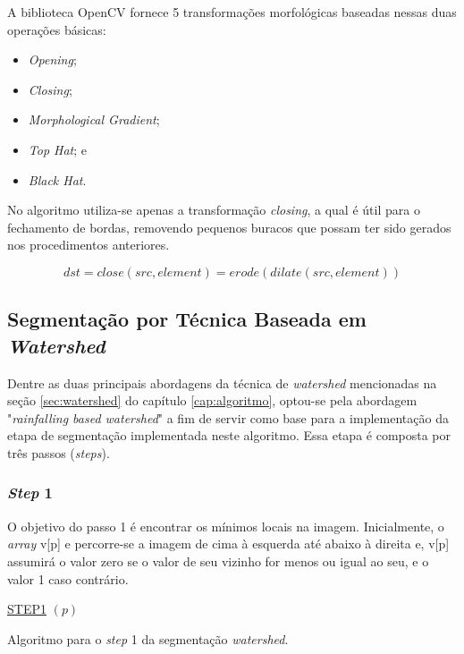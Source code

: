A biblioteca OpenCV fornece 5 transformações morfológicas baseadas nessas duas operações básicas:
\begin{itemize}
    \item \textit{Opening};
    \item \textit{Closing};
    \item \textit{Morphological Gradient};
    \item \textit{Top Hat}; e 
    \item \textit{Black Hat}.
\end{itemize} 

No algoritmo utiliza-se apenas a transformação \textit{closing}, a qual é útil para o fechamento de bordas, removendo pequenos buracos que possam ter sido gerados nos procedimentos anteriores. \citep{morphology_transformations}

\[dst = close(src, element) = erode(dilate(src, element))\]


\subsection{Segmentação por Técnica Baseada em \textit{Watershed}}
Dentre as duas principais abordagens da técnica de \textit{watershed} mencionadas na seção \ref{sec:watershed} do capítulo \ref{cap:algoritmo}, optou-se pela abordagem "\textit{rainfalling based watershed}" a fim de servir como base para a implementação da etapa de segmentação implementada neste algoritmo. Essa etapa é composta por três passos (\textit{steps}). 

\subsubsection{\textit{Step} 1}
O objetivo do passo 1 é encontrar os mínimos locais na imagem. Inicialmente, o \textit{array} v[p] e percorre-se a imagem de cima à esquerda até abaixo à direita e, v[p] assumirá o valor zero se o valor de seu vizinho for menos ou igual ao seu, e o valor 1 caso contrário.


\begin{algorithm}[H]
\SetAlgoLined


    \underline{STEP1} $(p)$\;
 
\caption{Algoritmo para o \textit{step} 1 da segmentação \textit{watershed}. \cite{ruparelia2012implementation}}
\end{algorithm}

